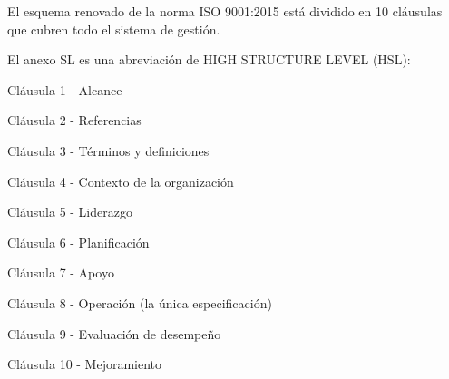 \documentclass[10pt,a4paper]{article}
\begin{document}
El esquema renovado de la norma ISO 9001:2015 está dividido en 10 cláusulas que cubren todo el sistema de gestión.

El anexo SL es una abreviación de HIGH STRUCTURE LEVEL (HSL):

Cláusula 1 - Alcance

Cláusula 2 - Referencias

Cláusula 3 - Términos y definiciones

Cláusula 4 - Contexto de la organización

Cláusula 5 - Liderazgo

Cláusula 6 - Planificación

Cláusula 7 - Apoyo

Cláusula 8 - Operación (la única especificación)

Cláusula 9 - Evaluación de desempeño

Cláusula 10 - Mejoramiento
\end{document}
